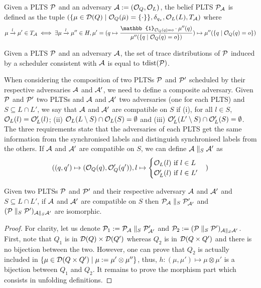 \begin{definition}
    Given a PLTS $\mathcal{P}$ and an adversary $\mathcal{A} :=(\mathcal{O}_Q,\mathcal{O}_L)$, the belief PLTS
    $\mathcal{P}_{\mathcal{A}}$ is defined as the tuple
    $(\{\mu \in \mathcal{D}(Q) \mid \mathcal{O}_Q(\bar\mu) = \{\cdot\} \},
    \delta_{q_\star}, \mathcal{O}_L(L), T_{\mathcal{A}})$
    where
    \[
        \mu \xrightarrow{l} \mu' \in T_ {\acal} \iff
        \exists \mu \xrightarrow{l} \mu'' \in H,
        \mu' = (q \mapsto
        \frac{\mathbb{1}_{\ocal_Q(q) = o} \cdot \mu''(q)}{\mu''(\{q \mid \ocal_Q(q) = o\})})
        \mapsto \mu''(\{q \mid \ocal_Q(q) = o\})
    \]
\end{definition}

\begin{theorem}
    \label{thm:partialinfosound}
    Given a PLTS $\mathcal{P}$ and an adversary $\mathcal{A}$, the set of trace distributions
    of $\mathcal{P}$ induced by a scheduler consistent with $\mathcal{A}$ is equal to $ \text{tdist}(\mathcal{P})$.
\end{theorem}

When considering the composition of two PLTSs $\mathcal{P}$ and $\mathcal{P}'$ scheduled by
their respective adversaries $\mathcal{A}$ and $\mathcal{A}'$, we need to define a composite
adversary. Given $\mathcal{P}$ and $\mathcal{P}'$ two PLTSs and $\mathcal{A}$ and $\mathcal{A}'$ two adversaries
(one for each PLTS) and $S \subseteq L \cap L'$, we say that $\mathcal{A}$ and $\mathcal{A}'$ are
compatible on $S$ if (i), for all $l \in S$, $\mathcal{O}_L(l) = \mathcal{O}'_L(l)$;
(ii) $\mathcal{O}_L(L \setminus S) \cap \mathcal{O}_L(S) = \emptyset$ and
(iii) $\mathcal{O}'_L(L' \setminus S) \cap \mathcal{O}'_L(S) = \emptyset$.
The three requirements state that the adversaries of each PLTS get the same
information from the synchronised labels and distinguish synchronised labels
from the others. If $\mathcal{A}$ and $\mathcal{A}'$ are compatible on $S$, we can define
$\mathcal{A} \parallel_S \mathcal{A}'$ as
\[
    ((q,q') \mapsto (\mathcal{O}_Q(q),\mathcal{O}'_Q(q')),
    l \mapsto
    \begin{cases}
        \mathcal{O}_L(l) \text{ if } l \in L \\
        \mathcal{O}_L'(l) \text{ if } l \in L'
    \end{cases})
\]

\begin{theorem}
    \label{thm:partialinfocompo}
    Given two PLTSs $\mathcal{P}$ and $\mathcal{P}'$ and their respective adversary $\mathcal{A}$
    and $\mathcal{A}'$ and $S \subseteq L\cap L'$, if $\mathcal{A}$ and $\mathcal{A}'$ are compatible
    on $S$ then $\mathcal{P}_{\mathcal{A}} \parallel_S \mathcal{P}'_{\mathcal{A}'}$ and
    $(\mathcal{P} \parallel_S \mathcal{P}')_{\mathcal{A} \parallel_S \mathcal{A}'}$ are isomorphic.
\end{theorem}
\begin{proof}
    For clarity, let us denote $\mathcal{P}_1 := \mathcal{P}_{\mathcal{A}} \parallel_S \mathcal{P}'_{\mathcal{A}'}$ and
    $\mathcal{P}_2 := (\mathcal{P} \parallel_S \mathcal{P}')_{\mathcal{A} \parallel_S \mathcal{A}'}$.
    First, note that $Q_1$ is in $\mathcal{D}(Q) \times \mathcal{D}(Q')$
    whereas $Q_2$ is in $\mathcal{D}(Q \times Q')$ and there is no bijection between
    the two. However, one can prove that $Q_2$ is actually included in
    $\{\mu \in \mathcal{D}(Q \times Q') \mid \mu := \mu' \otimes \mu''\}$, thus,
    $h : (\mu,\mu') \mapsto \mu \otimes \mu'$ is a bijection between $Q_1$ and $Q_2$.
    It remains to prove the morphism part which consists in unfolding definitions.
\end{proof}
